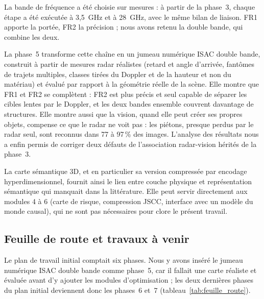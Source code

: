 \documentclass[12pt,a4paper,titlepage]{article}
\begin{document}
La bande de fréquence a été choisie sur mesures : à partir de la phase~3, chaque étape a été exécutée à 3,5~GHz et à 28~GHz, avec le même bilan de liaison. FR1 apporte la portée, FR2 la précision ; nous avons retenu la double bande, qui combine les deux.

La phase~5 transforme cette chaîne en un jumeau numérique ISAC double bande, construit à partir de mesures radar réalistes (retard et angle d'arrivée, fantômes de trajets multiples, classes tirées du Doppler et de la hauteur et non du matériau) et évalué par rapport à la géométrie réelle de la scène. Elle montre que FR1 et FR2 se complètent : FR2 est plus précis et seul capable de séparer les cibles lentes par le Doppler, et les deux bandes ensemble couvrent davantage de structures. Elle montre aussi que la vision, quand elle peut créer ses propres objets, compense ce que le radar ne voit pas : les piétons, presque perdus par le radar seul, sont reconnus dans 77 à 97\,\% des images. L'analyse des résultats nous a enfin permis de corriger deux défauts de l'association radar-vision hérités de la phase~3.

La carte sémantique 3D, et en particulier sa version compressée par encodage hyperdimensionnel, fournit ainsi le lien entre couche physique et représentation sémantique qui manquait dans la littérature. Elle peut servir directement aux modules 4 à 6 (carte de risque, compression JSCC, interface avec un modèle du monde causal), qui ne sont pas nécessaires pour clore le présent travail.

\subsection*{Feuille de route et travaux à venir}

Le plan de travail initial comptait six phases. Nous y avons inséré le jumeau numérique ISAC double bande comme phase~5, car il fallait une carte réaliste et évaluée avant d'y ajouter les modules d'optimisation ; les deux dernières phases du plan initial deviennent donc les phases~6 et~7 (tableau~\ref{tab:feuille_route}).
\end{document}
